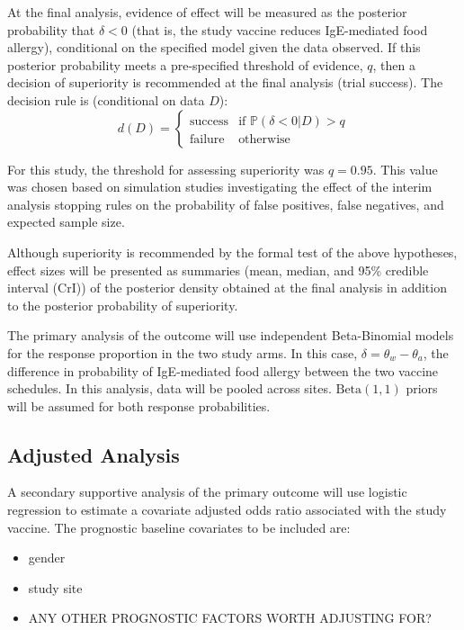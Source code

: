 \documentclass{bmcart}
\begin{document}
At the final analysis, evidence of effect will be measured as the posterior probability that $\delta < 0$ (that is, the study vaccine reduces IgE-mediated food allergy), conditional on the specified model given the data observed.
If this posterior probability meets a pre-specified threshold of evidence, \(q\), then a decision of superiority is recommended at the final analysis (trial success).
The decision rule is (conditional on data $D$):
$$
d(D) = \begin{cases}
\text{success} & \text{if } \mathbb{P}(\delta<0|D)>q \\
\text{failure}\ & \text{otherwise}
\end{cases}
$$

For this study, the threshold for assessing superiority was $q=0.95$.
This value was chosen based on simulation studies investigating the effect of the interim analysis stopping rules on the probability of false positives, false negatives, and expected sample size.

Although superiority is recommended by the formal test of the above hypotheses, effect sizes will be presented as summaries (mean, median, and 95\% credible interval (CrI)) of the posterior density obtained at the final analysis in addition to the posterior probability of superiority.

The primary analysis of the outcome will use independent Beta-Binomial models for the response proportion in the two study arms.
In this case, $\delta=\theta_w-\theta_a$, the difference in probability of IgE-mediated food allergy between the two vaccine schedules.
In this analysis, data will be pooled across sites.
$\text{Beta}(1,1)$ priors will be assumed for both response probabilities.

\subsection*{Adjusted Analysis}

A secondary supportive analysis of the primary outcome will use logistic regression to estimate a covariate adjusted odds ratio associated with the study vaccine.
The prognostic baseline covariates to be included are:
\begin{itemize}
	\item gender
	\item study site
	\item ANY OTHER PROGNOSTIC FACTORS WORTH ADJUSTING FOR?
\end{itemize}
\end{document}
